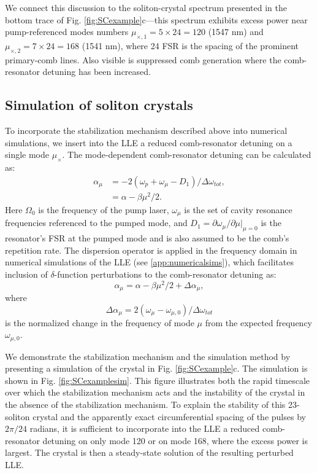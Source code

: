 We connect this discussion to the soliton-crystal spectrum presented in the bottom trace of Fig. \ref{fig:SCexample}c---this spectrum exhibits excess power near pump-referenced modes numbers $\mu_{\times,1}=5\times24=120$ (1547 nm) and $\mu_{\times,2}=7\times24=168$  (1541 nm), where 24 FSR is the spacing of the prominent primary-comb lines. Also visible is suppressed comb generation where the comb-resonator detuning has been increased. 

\subsection{Simulation of soliton crystals}

To incorporate the stabilization mechanism described above into numerical simulations, we insert into the LLE a reduced comb-resonator detuning on a single mode $\mu_\times$. The mode-dependent comb-resonator detuning can be calculated as:
\begin{align}
\alpha_\mu&=-2(\omega_p+\omega_\mu-D_1)/\Delta\omega_{tot},\\
&=\alpha-\beta\mu^2/2.
\end{align}
Here $\Omega_0$ is the frequency of the pump laser, $\omega_\mu$ is the set of cavity resonance frequencies referenced to the pumped mode, and $D_1=\partial\omega_\mu/\partial\mu|_{\mu=0}$ is the resonator's FSR at the pumped mode and is also assumed to be the comb's repetition rate. The dispersion operator is applied in the frequency domain in numerical simulations of the LLE (see \ref{app:numericalsims}), which facilitates inclusion of $\delta$-function perturbations to the comb-resonator detuning as:
\begin{equation}
\alpha_\mu=\alpha-\beta\mu^2/2+\Delta\alpha_\mu,
\end{equation}
where
\begin{equation}
\Delta\alpha_\mu=2(\omega_\mu-\omega_{\mu,0})/\Delta\omega_{tot}
\end{equation}
is the normalized change in the frequency of mode $\mu$ from the expected frequency $\omega_{\mu,0}$. 

We demonstrate the stabilization mechanism and the simulation method by presenting a simulation of the crystal in Fig. \ref{fig:SCexample}c. The simulation is shown in Fig. \ref{fig:SCexamplesim}. This figure illustrates both the rapid timescale over which the stabilization mechanism acts and the instability of the crystal in the absence of the stabilization mechanism. To explain the stability of this 23-soliton crystal and the apparently exact circumferential spacing of the pulses by $2\pi/24$ radians, it is sufficient to incorporate into the LLE a reduced comb-resonator detuning on only mode 120 or on mode 168, where the excess power is largest. The crystal is then a steady-state solution of the resulting perturbed LLE.

